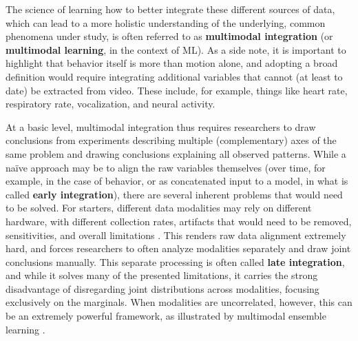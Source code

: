 The science of learning how to better integrate these different sources of data, which can lead to a more holistic understanding of the underlying, common phenomena under study, is often referred to as \textbf{multimodal integration} (or \textbf{multimodal learning}, in the context of ML). As a side note, it is important to highlight that behavior itself is more than motion alone, and adopting a broad definition would require integrating additional variables that cannot (at least to date) be extracted from video. These include, for example, things like heart rate, respiratory rate, vocalization, and neural activity.

At a basic level, multimodal integration thus requires researchers to  draw conclusions from experiments describing multiple (complementary) axes of the same problem and drawing conclusions explaining all observed patterns. While a naïve approach may be to align the raw variables themselves (over time, for example, in the case of behavior, or as concatenated input to a model, in what is called \textbf{early integration}), there are several inherent problems that would need to be solved. For starters, different data modalities may rely on different hardware, with different collection rates, artifacts that would need to be removed, sensitivities, and overall limitations \cite{Jabeen2022ALearning}. This renders raw data alignment extremely hard, and forces researchers to often analyze modalities separately and draw joint conclusions manually. This separate processing is often called \textbf{late integration}, and while it solves many of the presented limitations, it carries the strong disadvantage of disregarding joint distributions across modalities, focusing exclusively on the marginals. When modalities are uncorrelated, however, this can be an extremely powerful framework, as illustrated by multimodal ensemble learning \cite{Ganaie2022EnsembleReview}.

